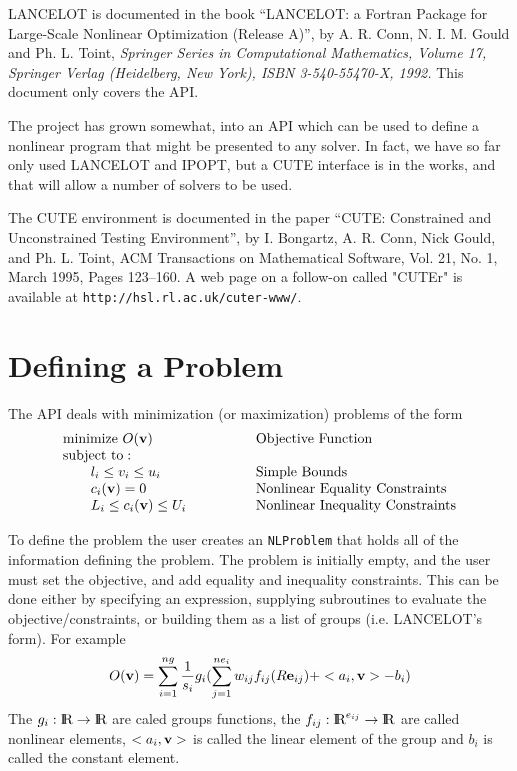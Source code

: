 \documentclass[12pt]{article}
\def\R{\hbox{\rm I\kern-.2150em R}}
\def\into{\rightarrow}
\begin{document}
    LANCELOT is documented in the book ``LANCELOT: a Fortran Package for
    Large-Scale Nonlinear Optimization (Release A)'', by A. R. Conn, 
    N. I. M. Gould and Ph. L. Toint, {\it Springer Series in Computational 
    Mathematics, Volume 17, Springer Verlag (Heidelberg, New York), 
    ISBN 3-540-55470-X, 1992.} This document only covers the API.

    The project has grown somewhat, into an API which can be used to define a
    nonlinear program that might be presented to any solver.
    In fact, we have so far only used LANCELOT and IPOPT, but a CUTE interface
    is in the works, and that will allow a number of solvers to be used.

    The CUTE environment is documented in the paper ``CUTE: Constrained and Unconstrained
    Testing Environment'', by I. Bongartz, A. R. Conn, Nick Gould, and Ph. L. Toint,
    ACM Transactions on Mathematical Software, Vol. 21, No. 1, March 1995, Pages 123--160.
    A web page on a follow-on called "CUTEr" is available at {\tt http://hsl.rl.ac.uk/cuter-www/}.

   \section{Defining a Problem}

   The API deals with minimization (or maximization) problems of the form
   \begin{displaymath}
     \begin{array}{ll}
      {\rm minimize}~O({\bf v})& \qquad\qquad \rm Objective~Function\\
      {\rm subject~to:}\\
      \qquad l_i \leq v_i \leq u_i& \qquad\qquad  \rm Simple~Bounds\\
      \qquad c_i({\bf v}) = 0& \qquad\qquad \rm Nonlinear~Equality
                                                      ~Constraints\\
      \qquad L_i \leq c_i({\bf v}) \leq U_i& \qquad\qquad \rm Nonlinear
                                                      ~Inequality~Constraints\\
     \end{array}
   \end{displaymath}

     To define the problem the user creates an {\tt NLProblem} that
    holds all of the information defining the problem. The problem is initially
    empty, and the user must set the objective, and add equality and inequality constraints.
    This can be done either by specifying an expression, supplying subroutines to evaluate the
    objective/constraints, or building them as a list of groups (i.e. LANCELOT's form). For example
    \begin{displaymath}
     O({\bf v}) = \sum_{i=1}^{ng} {1\over s_i}g_i( \sum_{j=1}^{ne_i} w_{ij} f_{ij}(R {\bf e}_{ij}) 
             + <a_i,{\bf v}> - b_i)
    \end{displaymath}
    The $g_i:\R\into\R$ are caled groups functions, the $f_{ij}:\R^{e_{ij}}\into\R$ are called nonlinear
    elements, $<a_i,{\bf v}>$ is called the linear element of the group and $b_i$ is called 
    the constant element.
\end{document}

